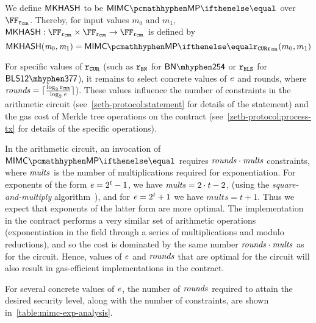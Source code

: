 We define $\mathsf{MKHASH}$ to be $\mimcMPPrime{}$ over $\FFx{\rCURVE}$. Thereby, for input values $m_0$ and $m_1$, $\mkhash : \FFx{\rCURVE} \times \FFx{\rCURVE} \to \FFx{\rCURVE}$ is defined by
\begin{equation}\label{instantiation:eq:mkhash-instantiation}
    \mkhash(\msg_0, \msg_1) = \mimcMPPrime{\rCURVE}(m_0, m_1)
\end{equation}

\newcommand{\constraints}{\varstyle{constraints}}

For specific values of $\mathtt{r_{CUR}}$ (such as $\mathtt{r_{BN}}$ for $\BNCurve$ or $\mathtt{r_{BLS}}$ for $\BLSCurve$), it remains to select concrete values of $\mathit{e}{}$ and rounds, where $\mathit{rounds} = \lceil \frac{\log_2 \mathtt{r_{CUR}}}{\log_2 \mathit{e}{}} \rceil$).  These values influence the number of constraints in the arithmetic circuit (see~\cref{zeth-protocol:statement} for details of the statement) and the gas cost of Merkle tree operations on the contract (see~\cref{zeth-protocol:process-tx} for details of the specific operations).

In the arithmetic circuit, an invocation of $\mimcMPPrime{}$ requires $\mathit{rounds} \cdot \mathit{mults}$ constraints, where $\mathit{mults}$ is the number of multiplications required for exponentiation. For exponents of the form $\mathit{e} = 2^t - 1$, we have $\mathit{mults} = 2 \cdot t - 2$, (using the \emph{square-and-multiply} algorithm~\cite{menezes1996handbook}), and for $\mathit{e} = 2^t + 1$ we have $mults = t + 1$. Thus we expect that exponents of the latter form are more optimal. The implementation in the contract performs a very similar set of arithmetic operations (exponentiation in the field through a series of multiplications and modulo reductions), and so the cost is dominated by the same number $\mathit{rounds} \cdot \mathit{mults}$ as for the circuit.  Hence, values of $\mathit{e}$ and $\mathit{rounds}$ that are optimal for the circuit will also result in gas-efficient implementations in the contract.

For several concrete values of $\mathit{e}{}$, the number of $\mathit{rounds}$ required to attain the desired security level, along with the number of constraints, are shown in~\cref{table:mimc-exp-analysis}.

